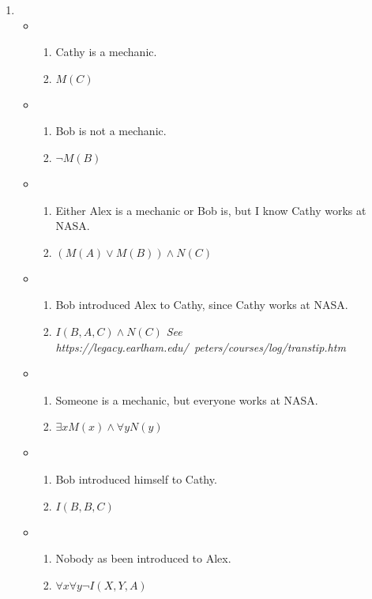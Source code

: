 \documentclass{article}
\begin{document}
\begin{enumerate}
    \item %
    \begin{itemize}
        \item
        \begin{enumerate}
            \item Cathy is a mechanic.
            \item $M(C)$
        \end{enumerate}
        \item
        \begin{enumerate}
            \item Bob is not a mechanic.
            \item $\neg M(B)$
        \end{enumerate}
        \item
        \begin{enumerate}
            \item Either Alex is a mechanic or Bob is, but I know Cathy works at NASA.
            \item $(M(A) \vee M(B)) \wedge N(C)$
        \end{enumerate}
        \item
        \begin{enumerate}
            \item Bob introduced Alex to Cathy, since Cathy works at NASA.
            \item $I(B,A,C) \wedge N(C)$ \textit{See https://legacy.earlham.edu/~peters/courses/log/transtip.htm}
        \end{enumerate}
        \item
        \begin{enumerate}
            \item Someone is a mechanic, but everyone works at NASA.
            \item $\exists x M(x) \wedge \forall y N(y)$
        \end{enumerate}
        \item
        \begin{enumerate}
            \item Bob introduced himself to Cathy.
            \item $I(B, B, C)$
        \end{enumerate}
        \item
        \begin{enumerate}
            \item Nobody as been introduced to Alex.
            \item $\forall x \forall y \neg I(X, Y, A)$

\end{enumerate}
\end{itemize}
\end{enumerate}
\end{document}
